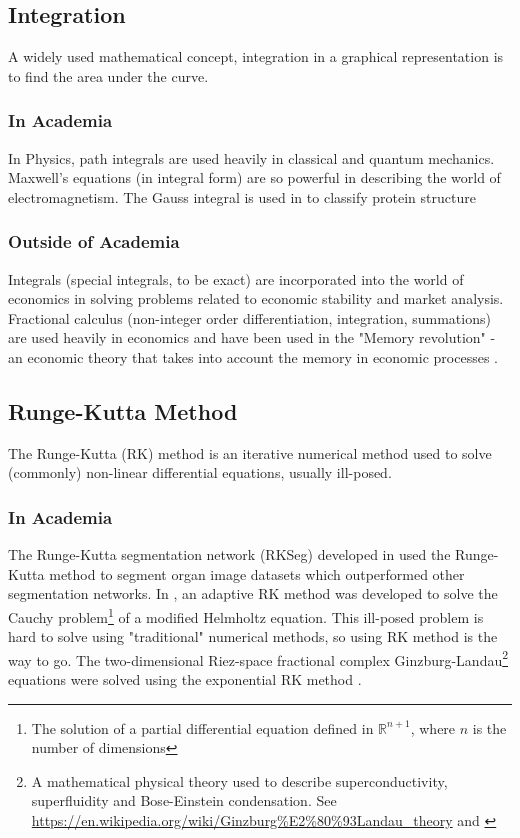 \documentclass[a4paper, 10pt, conference]{ieeeconf}      %
\begin{document}
\subsection{Integration}
A widely used mathematical concept, integration in a graphical representation is to find the area under the curve.
\\
\subsubsection{In Academia}
In Physics, path integrals are used heavily in classical and quantum mechanics. Maxwell's equations (in integral form) are so powerful in describing the world of electromagnetism. The Gauss integral is used in \cite{Rogen2003} to classify protein structure 
\\
\subsubsection{Outside of Academia}
Integrals (special integrals, to be exact) are incorporated into the world of economics \cite{Sherdor2023} in solving problems related to economic stability and market analysis. Fractional calculus (non-integer order differentiation, integration, summations) \cite{Ross1977} are used heavily in economics and have been used in the "Memory revolution" - an economic theory that takes into account the memory in economic processes \cite{Tarasov2019}. 
\\
\subsection{Runge-Kutta Method} %
The Runge-Kutta (RK) method is an iterative numerical method used to solve (commonly) non-linear differential equations, usually ill-posed. 
\\
\subsubsection{In Academia} %
The Runge-Kutta segmentation network (RKSeg) developed in \cite{Zhu2023} used the Runge-Kutta method to segment organ image datasets which outperformed other segmentation networks. In \cite{Jday2023}, an adaptive RK method was developed to solve the Cauchy problem\footnote{The solution of a partial differential equation defined in $\mathbb{R}^{n+1}$, where $n$ is the number of dimensions} of a modified Helmholtz equation. This ill-posed problem is hard to solve using "traditional" numerical methods, so using RK method is the way to go. The two-dimensional Riez-space fractional complex Ginzburg-Landau\footnote{A mathematical physical theory used to describe superconductivity, superfluidity and Bose-Einstein condensation. See \url{https://en.wikipedia.org/wiki/Ginzburg\%E2\%80\%93Landau_theory} and \cite{Aranson2002}} equations \cite{Wang2018} were solved using the exponential RK method \cite{Hochbruck2005}\cite{Hochbruck2010}.
\\
\end{document}
